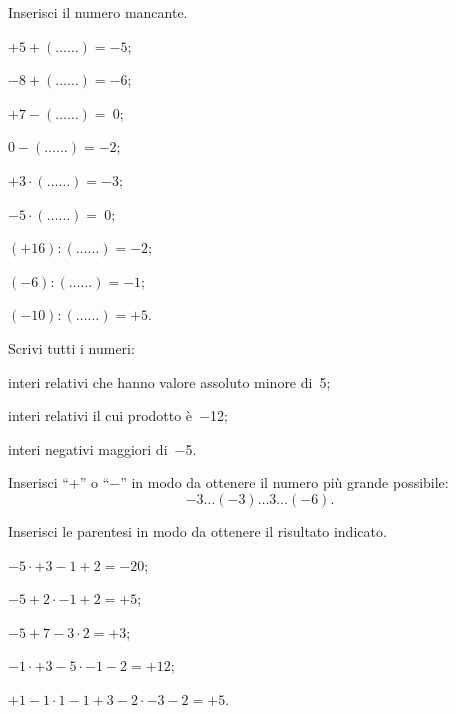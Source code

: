 \begin{esercizio}
Inserisci il numero mancante.
 \begin{multicols}{3}
 \begin{enumeratea}
 \item $+5 + (\ldots\ldots) = -5$;
 \item $-8 + (\ldots\ldots) = -6$;
 \item $+7 - (\ldots\ldots) =~0$;
 \item $0 - (\ldots\ldots) = -2$;
 \item $+3\cdot (\ldots\ldots) = -3$;
 \item $-5\cdot (\ldots\ldots) =~0$;
 \item $(+16): (\ldots\ldots) = -2$;
 \item $(-6): (\ldots\ldots) = -1$;
 \item $(-10): (\ldots\ldots) = +5$.
 \end{enumeratea}
 \end{multicols}
\end{esercizio}

\begin{esercizio}
 Scrivi tutti i numeri:
 \begin{enumeratea}
 \item interi relativi che hanno valore assoluto minore di~5;
 \item interi relativi il cui prodotto è~$-$12;
 \item interi negativi maggiori di~$-$5.
 \end{enumeratea}
\end{esercizio}

\begin{esercizio}
Inserisci ``$+$'' o ``$-$'' in modo da ottenere il numero più grande possibile:
 \[-3\ldots(-3)\ldots3\ldots(-6).\]
\end{esercizio}

\begin{esercizio}[\Ast]
Inserisci le parentesi in modo da ottenere il risultato indicato.
 \begin{enumeratea}
 \item $-5 \cdot +3-1+2=-20$;
 \item $-5+2\cdot-1+2=+5$;
 \item $-5+7-3\cdot 2=+3$;
 \item $-1\cdot +3-5\cdot -1-2=+12$;
 \item $+1-1\cdot 1 -1+3-2\cdot -3-2=+5$.
 \end{enumeratea}
\end{esercizio}

